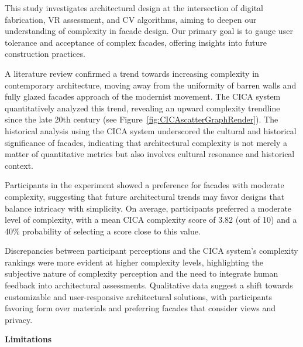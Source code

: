 


This study investigates architectural design at the intersection of digital fabrication, VR assessment, and CV algorithms, aiming to deepen our understanding of complexity in facade design.
Our primary goal is to gauge user tolerance and acceptance of complex facades, offering insights into future construction practices.

A literature review confirmed a trend towards increasing complexity in contemporary architecture, moving away from the uniformity of barren walls and fully glazed facades approach of the modernist movement.
The CICA system quantitatively analyzed this trend, revealing an upward complexity trendline since the late 20th century (see Figure~\ref{fig:CICAscatterGraphRender}).
The historical analysis using the CICA system underscored the cultural and historical significance of facades, indicating that architectural complexity is not merely a matter of quantitative metrics but also involves cultural resonance and historical context.

Participants in the experiment showed a preference for facades with moderate complexity, suggesting that future architectural trends may favor designs that balance intricacy with simplicity.
On average, participants preferred a moderate level of complexity, with a mean CICA complexity score of 3.82 (out of 10) and a 40\% probability of selecting a score close to this value.

Discrepancies between participant perceptions and the CICA system's complexity rankings were more evident at higher complexity levels, highlighting the subjective nature of complexity perception and the need to integrate human feedback into architectural assessments.
Qualitative data suggest a shift towards customizable and user-responsive architectural solutions, with participants favoring form over materials and preferring facades that consider views and privacy.

\textbf{Limitations}

